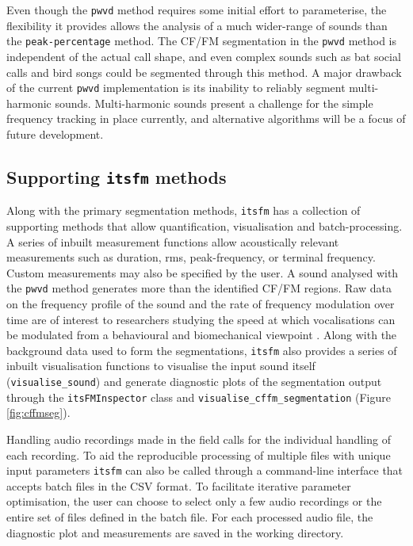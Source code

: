 \documentclass[
]{book}
\begin{document}
Even though the \texttt{pwvd} method requires some initial effort to parameterise, the flexibility it provides allows the analysis of a much wider-range of sounds than the \texttt{peak-percentage} method. The CF/FM segmentation in the \texttt{pwvd} method is independent of the actual call shape, and even complex sounds such as bat social calls and bird songs could be segmented through this method. A major drawback of the current \texttt{pwvd} implementation is its inability to reliably segment multi-harmonic sounds. Multi-harmonic sounds present a challenge for the simple frequency tracking in place currently, and alternative algorithms will be a focus of future development.

\hypertarget{supporting-itsfm-methods}{%
\subsection{\texorpdfstring{Supporting \texttt{itsfm} methods}{Supporting itsfm methods}}\label{supporting-itsfm-methods}}

Along with the primary segmentation methods, \texttt{itsfm} has a collection of supporting methods that allow quantification, visualisation and batch-processing. A series of inbuilt measurement functions allow acoustically relevant measurements such as duration, rms, peak-frequency, or terminal frequency. Custom measurements may also be specified by the user. A sound analysed with the \texttt{pwvd} method generates more than the identified CF/FM regions. Raw data on the frequency profile of the sound and the rate of frequency modulation over time are of interest to researchers studying the speed at which vocalisations can be modulated from a behavioural and biomechanical viewpoint \citep{metzner2016ultrasound, hage2013ambient}. Along with the background data used to form the segmentations, \texttt{itsfm} also provides a series of inbuilt visualisation functions to visualise the input sound itself (\texttt{visualise\_sound}) and generate diagnostic plots of the segmentation output through the \texttt{itsFMInspector} class and \texttt{visualise\_cffm\_segmentation} (Figure \ref{fig:cffmseg}).

Handling audio recordings made in the field calls for the individual handling of each recording. To aid the reproducible processing of multiple files with unique input parameters \texttt{itsfm} can also be called through a command-line interface that accepts batch files in the CSV format. To facilitate iterative parameter optimisation, the user can choose to select only a few audio recordings or the entire set of files defined in the batch file. For each processed audio file, the diagnostic plot and measurements are saved in the working directory.
\end{document}
